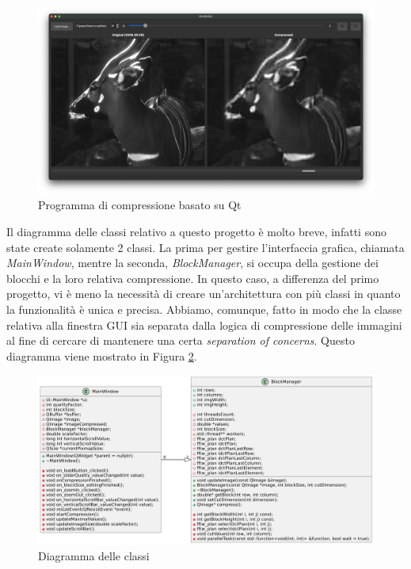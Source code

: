 \begin{figure}[h]
	\centering
	\includegraphics[width=1\linewidth]{figures/qt_deer}
	\caption{Programma di compressione basato su Qt}
	\label{fig:deer}
\end{figure}

Il diagramma delle classi relativo a questo progetto è molto breve, infatti sono state create solamente 2 classi. La prima per gestire l'interfaccia grafica, chiamata \textit{MainWindow}, mentre la seconda, \textit{BlockManager}, si occupa della gestione dei blocchi e la loro relativa compressione. In questo caso, a differenza del primo progetto, vi è meno la necessità di creare  un'architettura con più classi in quanto la funzionalità è unica e precisa. Abbiamo, comunque, fatto in modo che la classe relativa alla finestra GUI sia separata dalla logica di compressione delle immagini al fine di cercare di mantenere una certa \textit{separation of concerns}. Questo diagramma viene mostrato in Figura \ref{fig:class_diagram}.


\begin{figure}[h]
	\centering
	\includegraphics[width=1\linewidth]{figures/class diagram}
	\caption{Diagramma delle classi}
	\label{fig:class_diagram}
\end{figure}

